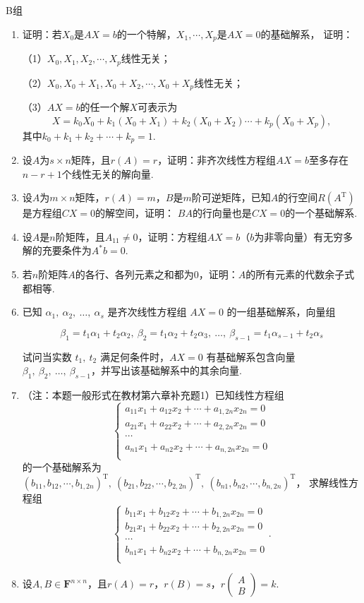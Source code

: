 \centerline{\heiti B组}
\begin{enumerate}
	\item 证明：若$X_0$是$AX=b$的一个特解，$X_1,\cdots,X_p$是$AX=0$的基础解系，
	证明：
	
	（1）$X_0,X_1,X_2,\cdots,X_p$线性无关；
	
	（2）$X_0,X_0+X_1,X_0+X_2,\cdots,X_0+X_p$线性无关；
	
	（3）$AX=b$的任一个解$X$可表示为
	$$X=k_0X_0+k_1(X_0+X_1)+k_2(X_0+X_2)\cdots+k_p(X_0+X_p),$$
	其中$k_0+k_1+k_2+\cdots+k_p=1$.
	\item 设$A$为$s \times n$矩阵，且$r(A)=r$，证明：非齐次线性方程组$AX=b$至多存在$n-r+1$个线性无关的解向量.
	\item 设$A$为$m \times n$矩阵，$r(A)=m$，$B$是$m$阶可逆矩阵，已知$A$的行空间$R(A^\mathrm{T})$是方程组$CX=0$的解空间，证明：
	$BA$的行向量也是$CX=0$的一个基础解系.
	\item 设$A$是$n$阶矩阵，且$A_{11}\neq 0$，证明：方程组$AX=b$（$b$为非零向量）有无穷多解的充要条件为$A^*b=0$.
	\item 若$n$阶矩阵$A$的各行、各列元素之和都为0，证明：$A$的所有元素的代数余子式都相等.
	\item 已知 $\alpha_1,\ \alpha_2,\ \dots,\ \alpha_s$ 是齐次线性方程组 $AX=0$ 的一组基础解系，向量组

	$$
	\beta_1=t_1\alpha_1+t_2\alpha_2,\ \beta_2=t_1\alpha_2+t_2\alpha_3,\ \dots,\ \beta_{s-1}=t_1\alpha_{s-1}+t_2\alpha_s
	$$
	
	试问当实数 $t_1,\ t_2$ 满足何条件时，$AX=0$ 有基础解系包含向量 $\beta_1,\ \beta_2,\ \dots,\ \beta_{s-1}$，并写出该基础解系中的其余向量.
	\item （注：本题一般形式在教材第六章补充题1）已知线性方程组$$\begin{cases}
		a_{11}x_1+a_{12}x_2+\cdots+a_{1,2n}x_{2n}=0 \\
		a_{21}x_1+a_{22}x_2+\cdots+a_{2,2n}x_{2n}=0 \\
		\cdots \\
		a_{n1}x_1+a_{n2}x_2+\cdots+a_{n,2n}x_{2n}=0 \\
	\end{cases}$$
	的一个基础解系为$(b_{11},b_{12},\cdots,b_{1,2n})^\mathrm{T},\ (b_{21},b_{22},\cdots,b_{2,2n})^\mathrm{T},\ (b_{n1},b_{n2},\cdots,b_{n,2n})^\mathrm{T}$，
	求解线性方程组$$\begin{cases}
		b_{11}x_1+b_{12}x_2+\cdots+b_{1,2n}x_{2n}=0 \\
		b_{21}x_1+b_{22}x_2+\cdots+b_{2,2n}x_{2n}=0 \\
		\cdots \\
		b_{n1}x_1+b_{n2}x_2+\cdots+b_{n,2n}x_{2n}=0 \\
	\end{cases}.$$
	\item 设$A,B\in \mathbf{F}^{n\times n}$，且$r(A)=r$，$r(B)=s$，$r\begin{pmatrix}
		A \\ B
	\end{pmatrix}=k$.


\end{enumerate}
